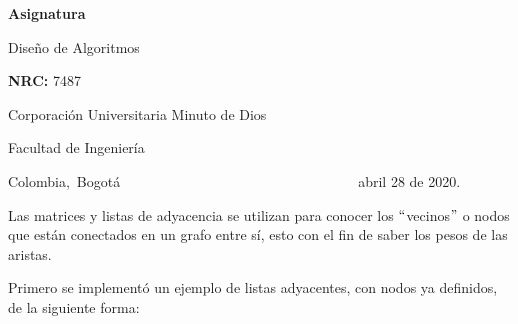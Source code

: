 \documentclass[12pt]{article}
\renewcommand{\_}{\kern-1.5pt\textunderscore\kern-1.5pt}
\begin{document}
\begin{Center}
\textbf{Asignatura}
\end{Center}\par

\begin{Center}
Diseño de Algoritmos
\end{Center}\par

\begin{Center}
 
\end{Center}\par

\begin{Center}
\textbf{NRC:} 7487
\end{Center}\par

\begin{Center}
 
\end{Center}\par

\begin{Center}
Corporación Universitaria Minuto de Dios
\end{Center}\par

\begin{Center}
Facultad de Ingeniería
\end{Center}\par

\begin{Center}
Colombia,\ Bogotá\ \ \ \ \ \ \ \ \ \ \ \ \ \ \ \ \ \ \ \ \ \ \ \ \ \ \ \ \ \ \ \ \ \   abril 28 de 2020.
\end{Center}\par


\vspace{\baselineskip}

\vspace{\baselineskip}

\vspace{\baselineskip}

\vspace{\baselineskip}
Las matrices y listas de adyacencia se utilizan para conocer los $``$vecinos$"$  o nodos que están conectados en un grafo entre sí, esto con el fin de saber los pesos de las aristas.\par

Primero se implementó un ejemplo de listas adyacentes, con nodos ya definidos, de la siguiente forma:\par
\end{document}
